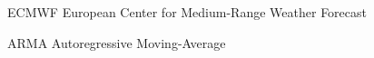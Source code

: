 \documentclass[
	12pt,				%
	openright,			%
	oneside,			%
	a4paper,			%
	english,			%
	french,				%
	spanish,			%
	brazil				%
	]{abntex2}
\begin{document}
 

  

\listoffigures*


\begin{siglas}
  \item[ECMWF] European Center for Medium-Range Weather Forecast
  \item[ARMA] Autoregressive Moving-Average
\end{siglas}


\tableofcontents*



\textual

\end{document}
